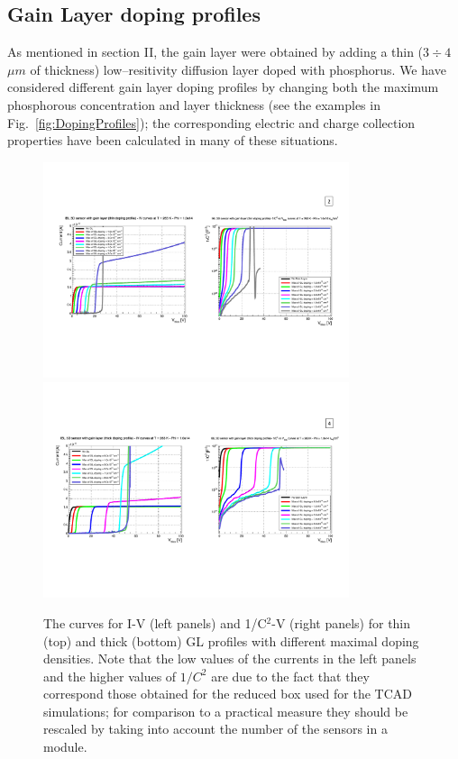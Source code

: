 \documentclass[aps,pt14,superscriptaddress,showpacs,floatfix,nofootinbib]{revtex4}
\begin{document}
\subsection{Gain Layer doping profiles}

As mentioned in section II, the gain layer were obtained by adding a thin ($3\div 4$ $\mu m$ of thickness) low--resitivity diffusion layer doped with phosphorus. We have considered different gain layer doping profiles by changing both the maximum phosphorous concentration and layer thickness (see the examples in  Fig.~\ref{fig:DopingProfiles}); the corresponding electric and charge collection properties have been calculated in many of these situations.

\begin{figure}[h!]
\begin{center}
\includegraphics[width=0.80\textwidth,keepaspectratio]{figures1/Thin_IV_CV_curves.pdf}
\includegraphics[width=0.80\textwidth,keepaspectratio]{figures1/Thick_IV_CV_curves.pdf}
\end{center}
\caption{The curves for I-V (left panels) and 1/C$^2$-V (right panels) for  thin (top) and thick (bottom) GL profiles  with different maximal doping densities. Note that the low values of the currents in the left panels and the higher values of $1/C^2$ are due to the fact that they correspond those obtained for the reduced box used for the TCAD simulations; for comparison to a practical measure they should be rescaled by taking into account the number of the sensors in a module.
\label{fig:IV-CV}}
\end{figure}
\end{document}
